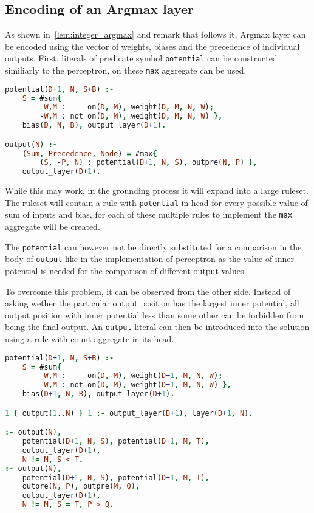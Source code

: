 \subsection{Encoding of an Argmax layer}

As shown in~\cref{lem:integer_argmax} and remark that follows it, Argmax layer can
be encoded using the vector of weights, biases and the precedence of individual outputs.
First, literals of predicate symbol \texttt{potential} can be constructed similiarly
to the perceptron, on these \texttt{max} aggregate can be used.

\begin{code}
\begin{lstlisting}[language=Prolog, numbers=none]
potential(D+1, N, S+B) :-
    S = #sum{
         W,M :     on(D, M), weight(D, M, N, W);
        -W,M : not on(D, M), weight(D, M, N, W) },
    bias(D, N, B), output_layer(D+1).

output(N) :-
    (Sum, Precedence, Node) = #max{
        (S, -P, N) : potential(D+1, N, S), outpre(N, P) },
    output_layer(D+1).
\end{lstlisting}
    \nobreak{}\label{enc:argmax_max}
\end{code}

While this may work, in the grounding process it will expand into a large ruleset.
The ruleset will contain a rule with \texttt{potential} in head for every
possible value of sum of inputs and bias, for each of these multiple rules
to implement the \texttt{max} aggregate will be created.

The \texttt{potential} can however not be directly substituted for a comparison
in the body of \texttt{output} like in the implementation of perceptron
as the value of inner potential is needed for the comparison of different output values.

To overcome this problem, it can be observed from the other side.
Instead of asking wether the particular output position has the largest inner potential,
all output position with inner potential less than some other can be forbidden from being
the final output. An \texttt{output} literal can then be introduced into the solution
using a rule with count aggregate in its head.

\begin{code}
\begin{lstlisting}[language=Prolog, numbers=none]
potential(D+1, N, S+B) :-
    S = #sum{
         W,M :     on(D, M), weight(D+1, M, N, W);
        -W,M : not on(D, M), weight(D+1, M, N, W) },
    bias(D+1, N, B), output_layer(D+1).

1 { output(1..N) } 1 :- output_layer(D+1), layer(D+1, N).

:- output(N),
    potential(D+1, N, S), potential(D+1, M, T),
    output_layer(D+1),
    N != M, S < T.
:- output(N),
    potential(D+1, N, S), potential(D+1, M, T),
    outpre(N, P), outpre(M, Q),
    output_layer(D+1),
    N != M, S = T, P > Q.
\end{lstlisting}
    \nobreak{}\label{enc:argmax_potential_pm1}
\end{code}

